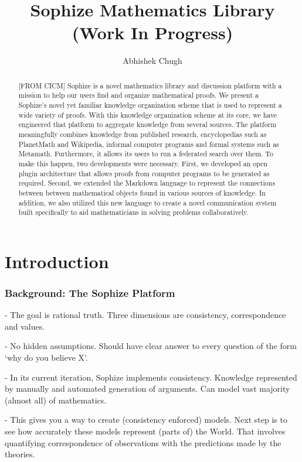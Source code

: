 \documentclass[a4paper]{article}
\title{Sophize Mathematics Library (Work In Progress) }
\author{ Abhishek Chugh }
\begin{document}
\maketitle

\begin{abstract}
[FROM CICM] Sophize is a novel mathematics library and discussion platform with a mission to help our users find and organize mathematical proofs. We present a Sophize's novel yet familiar knowledge organization scheme that is used to represent a wide variety of proofs. With this knowledge organization scheme at its core, we have engineered that platform to aggregate knowledge from several sources. The platform meaningfully combines knowledge from published research, encyclopedias such as PlanetMath and Wikipedia, informal computer programs and formal systems such as Metamath. Furthermore, it allows its users to run a federated search over them. To make this happen, two developments were necessary. First, we developed an open plugin architecture that allows proofs from computer programs to be generated as required. Second, we extended the Markdown language to represent the connections between between mathematical objects found in various sources of knowledge. In addition, we also utilized this new language to create a novel communication system built specifically to aid mathematicians in solving problems collaboratively.

\end{abstract}

\vskip 32pt

\section{Introduction}

\subsubsection*{Background: The Sophize Platform}

- The goal is rational truth. Three dimensions are consistency, correspondence and values.

- No hidden assumptions. Should have clear answer to every question of the form `why do you believe X'.

- In its current iteration, Sophize implements consistency. Knowledge represented by manually and automated generation of arguments. Can model vast majority (almost all) of mathematics.

- This gives you a way to create (consistency enforced) models. Next step is to see how accurately these models represent (parts of) the World. That involves quantifying correspondence of observations with the predictions made by the theories.
\end{document}
